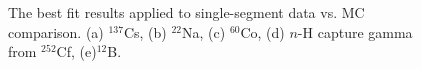 \begin{figure}[h!]
\centering
{}\quad
{} \\
 \quad
{} \\
\caption[Single segment data to MC gamma energy comparisons]{The best fit results applied to single-segment data vs. MC comparison. (a) $^{137}$Cs, (b) $^{22}$Na, (c) $^{60}$Co, (d) $n$-H capture gamma from $^{252}$Cf, (e)$^{12}$B.}
\label{fig:goodfit}
\end{figure}
\newpage
\clearpage

